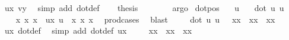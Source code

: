 \begin{isabellebody}
\ ux\ vy\ \isamarkupfalse%
\ {\isacharparenleft}{\kern0pt}simp\ add{\isacharcolon}{\kern0pt}\ dot{\isacharunderscore}{\kern0pt}def{\isacharparenright}{\kern0pt}\isanewline
\ \ \isamarkupfalse%
\ {\isacharquery}{\kern0pt}thesis\ \isamarkupfalse%
\ {}\ {}\ {}\ {}\ \isamarkupfalse%
\ argo\isanewline
{}\isamarkupfalse%
%
\endisatagproof
{\isafoldproof}%
%
\isadelimproof
\isanewline
%
\endisadelimproof
\isanewline
{}\isamarkupfalse%
\ dot{\isacharunderscore}{\kern0pt}pos{\isacharcolon}{\kern0pt}\isanewline
\ \ \ u\isanewline
\ \ \ {\isachardoublequoteopen}{\isacharparenleft}{\kern0pt}dot\ u\ u\ {\isasymge}\ {}{\isacharparenright}{\kern0pt}{\isachardoublequoteclose}\isanewline
%
\isadelimproof
%
\endisadelimproof
%
\isatagproof
{}\isamarkupfalse%
\ {\isacharminus}{\kern0pt}\isanewline
\ \ \isamarkupfalse%
\ x{}\ x{}\ x{}\ \ ux{\isacharcolon}{\kern0pt}\ {\isachardoublequoteopen}u\ {\isacharequal}{\kern0pt}\ {\isacharparenleft}{\kern0pt}x{}{\isacharcomma}{\kern0pt}\ x{}{\isacharcomma}{\kern0pt}\ x{}{\isacharparenright}{\kern0pt}{\isachardoublequoteclose}\ \isamarkupfalse%
\ prod{\isacharunderscore}{\kern0pt}cases{}\ \isamarkupfalse%
\ blast\isanewline
\ \ \isamarkupfalse%
\ {}{\isacharcolon}{\kern0pt}\ {\isachardoublequoteopen}dot\ u\ u\ \ {\isacharequal}{\kern0pt}\ x{}{\isacharasterisk}{\kern0pt}x{}\ {\isacharplus}{\kern0pt}\ x{}{\isacharasterisk}{\kern0pt}x{}\ {\isacharplus}{\kern0pt}\ x{}{\isacharasterisk}{\kern0pt}x{}\ {\isachardoublequoteclose}\ \isamarkupfalse%
\ ux\ dot{\isacharunderscore}{\kern0pt}def\ \isamarkupfalse%
\ {\isacharparenleft}{\kern0pt}simp\ add{\isacharcolon}{\kern0pt}\ dot{\isacharunderscore}{\kern0pt}def\ ux{\isacharparenright}{\kern0pt}\isanewline
\ \ \isamarkupfalse%
\ {}{\isacharcolon}{\kern0pt}\ {\isachardoublequoteopen}x{}{\isacharasterisk}{\kern0pt}x{}\ {\isacharplus}{\kern0pt}\ x{}{\isacharasterisk}{\kern0pt}x{}\ {\isacharplus}{\kern0pt}\ x{}{\isacharasterisk}{\kern0pt}x{}\ {\isasymge}\ {}\ {\isachardoublequoteclose}\ \isamarkupfalse%

\end{isabellebody}
